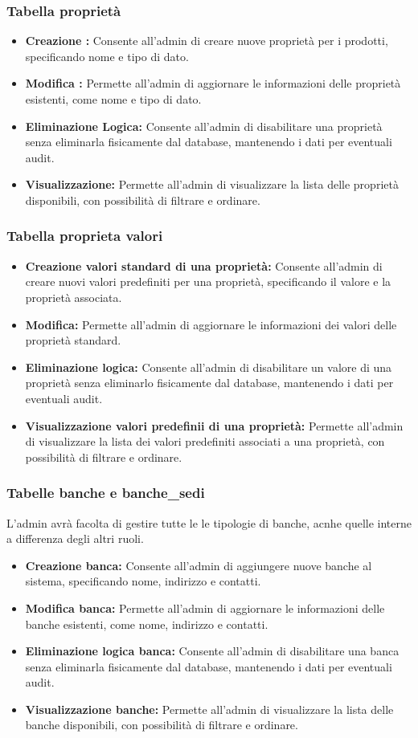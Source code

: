 \documentclass[12pt, a4paper]{article}
\begin{document}
\subsubsection{Tabella proprietà}
\begin{itemize}
    \item \textbf{Creazione :} Consente all'admin di creare nuove proprietà per i prodotti, specificando nome e tipo di dato.
    \item \textbf{Modifica :} Permette all'admin di aggiornare le informazioni delle proprietà esistenti, come nome e tipo di dato.
    \item \textbf{Eliminazione Logica:} Consente all'admin di disabilitare una proprietà senza eliminarla fisicamente dal database, mantenendo i dati per eventuali audit.
    \item \textbf{Visualizzazione:} Permette all'admin di visualizzare la lista delle proprietà disponibili, con possibilità di filtrare e ordinare.
\end{itemize}
\subsubsection{Tabella proprieta valori}
\begin{itemize}
    \item \textbf{Creazione valori standard di una proprietà:} Consente all'admin di creare nuovi valori predefiniti per una proprietà, specificando il valore e la proprietà associata.
    \item \textbf{Modifica:} Permette all'admin di aggiornare le informazioni dei valori delle proprietà standard.
    \item \textbf{Eliminazione logica:} Consente all'admin di disabilitare un valore di una proprietà senza eliminarlo fisicamente dal database, mantenendo i dati per eventuali audit.
    \item \textbf{Visualizzazione valori predefinii di una proprietà:} Permette all'admin di visualizzare la lista dei valori predefiniti associati a una proprietà, con possibilità di filtrare e ordinare.
\end{itemize}
\subsubsection{Tabelle banche e banche\_sedi}
L'admin avrà facolta di gestire tutte le le tipologie di banche, acnhe quelle interne a differenza degli altri ruoli.
\begin{itemize}
    \item \textbf{Creazione banca:} Consente all'admin di aggiungere nuove banche al sistema, specificando nome, indirizzo e contatti.
    \item \textbf{Modifica banca:} Permette all'admin di aggiornare le informazioni delle banche esistenti, come nome, indirizzo e contatti.
    \item \textbf{Eliminazione logica banca:} Consente all'admin di disabilitare una banca senza eliminarla fisicamente dal database, mantenendo i dati per eventuali audit.
    \item \textbf{Visualizzazione banche:} Permette all'admin di visualizzare la lista delle banche disponibili, con possibilità di filtrare e ordinare.
\end{itemize}
\end{document}
